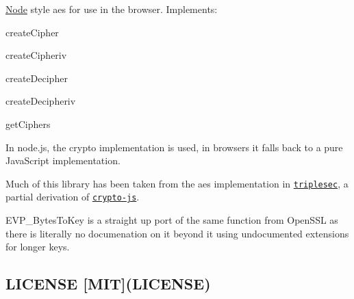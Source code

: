 \href{https://travis-ci.org/crypto-browserify/browserify-aes}{\tt }

\mbox{\hyperlink{classNode}{Node}} style aes for use in the browser. Implements\+:


\begin{DoxyItemize}
\item create\+Cipher
\item create\+Cipheriv
\item create\+Decipher
\item create\+Decipheriv
\item get\+Ciphers
\end{DoxyItemize}

In node.\+js, the {\ttfamily crypto} implementation is used, in browsers it falls back to a pure Java\+Script implementation.

Much of this library has been taken from the aes implementation in \href{https://github.com/keybase/triplesec}{\tt triplesec}, a partial derivation of \href{https://code.google.com/p/crypto-js/}{\tt crypto-\/js}.

{\ttfamily E\+V\+P\+\_\+\+Bytes\+To\+Key} is a straight up port of the same function from Open\+S\+SL as there is literally no documenation on it beyond it using \textquotesingle{}undocumented extensions\textquotesingle{} for longer keys.

\subsection*{L\+I\+C\+E\+N\+SE \mbox{[}M\+IT\mbox{]}(L\+I\+C\+E\+N\+SE)}
